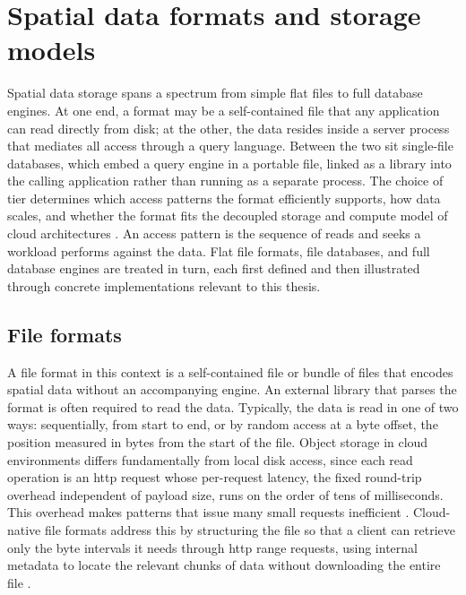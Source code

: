\section{Spatial data formats and storage models}
\label{background:spatial-data-formats-and-storage-models}

Spatial data storage spans a spectrum from simple flat files to full database engines. At one end, a format may be a self-contained file that any application can read directly from disk; at the other, the data resides inside a server process that mediates all access through a query language. Between the two sit single-file databases, which embed a query engine in a portable file, linked as a library into the calling application rather than running as a separate process. The choice of tier determines which access patterns the format efficiently supports, how data scales, and whether the format fits the decoupled storage and compute model of cloud architectures \parencite{cngfoundation2024_cloud_optimized_geospatial_formats_guide}. An access pattern is the sequence of reads and seeks a workload performs against the data. Flat file formats, file databases, and full database engines are treated in turn, each first defined and then illustrated through concrete implementations relevant to this thesis.

\subsection{File formats}
\label{background:spatial-data-formats-and-storage-models:file-formats}
A file format in this context is a self-contained file or bundle of files that encodes spatial data without an accompanying engine. An external library that parses the format is often required to read the data. Typically, the data is read in one of two ways: sequentially, from start to end, or by random access at a byte offset, the position measured in bytes from the start of the file. Object storage in cloud environments differs fundamentally from local disk access, since each read operation is an \acrshort{http} request whose per-request latency, the fixed round-trip overhead independent of payload size, runs on the order of tens of milliseconds. This overhead makes patterns that issue many small requests inefficient \parencite{esri2024_cloud_imagery_storage}. Cloud-native file formats address this by structuring the file so that a client can retrieve only the byte intervals it needs through \acrshort{http} range requests, using internal metadata to locate the relevant chunks of data without downloading the entire file \parencite{ogc2023_cog_standard_21026}.

